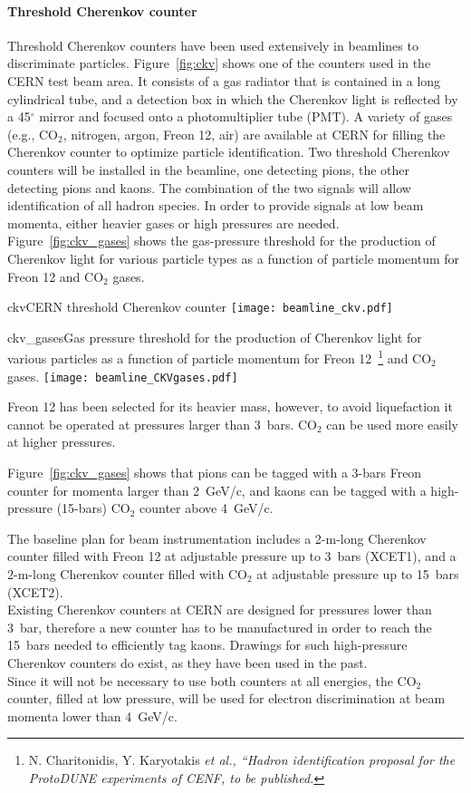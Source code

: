 \paragraph{Threshold Cherenkov counter}
Threshold Cherenkov counters have been used extensively in beamlines to discriminate particles. Figure~\ref{fig:ckv} shows one of the counters used in the CERN test beam area. It consists of a gas radiator that is contained in a long cylindrical tube, and a detection box in which the Cherenkov light is reflected by a 45$^\circ$ mirror and focused onto a photomultiplier tube (PMT). 
A variety of gases (e.g., CO$_2$, nitrogen, argon, Freon 12, air) are available at CERN for filling the Cherenkov counter to optimize particle identification. 
Two threshold Cherenkov counters will be installed in the beamline, one detecting pions, the other detecting pions 
and kaons. The combination of the two signals will allow identification of all hadron species. In order to provide signals at low beam momenta, either heavier gases or high pressures are needed.
Figure~\ref{fig:ckv_gases} shows the gas-pressure threshold 
for the production of Cherenkov light for various particle types as a function of particle momentum for Freon 12 and CO$_2$ gases.
\begin{cdrfigure}{ckv}{CERN threshold Cherenkov counter}
  \texttt{[image: beamline\_ckv.pdf]}
\end{cdrfigure}
\begin{cdrfigure}{ckv_gases}{Gas pressure threshold for the production of Cherenkov light for various particles as a function of particle momentum for Freon 12~\footnote{N. Charitonidis, Y. Karyotakis \it{et al.}, ``Hadron identification proposal for the ProtoDUNE experiments of CENF, to be published.} and CO$_2$ gases.}
  \texttt{[image: beamline\_CKVgases.pdf]}
\end{cdrfigure}
Freon 12 has been selected for its heavier mass, however,  to avoid liquefaction it cannot be operated at pressures larger than 3~bars.  CO$_2$ can be used more easily at higher pressures.  

 Figure~\ref{fig:ckv_gases} shows that pions can be tagged with a 3-bars Freon counter for momenta larger than 2~GeV/c, and kaons can be tagged with a high-pressure  (15-bars) CO$_2$  counter above 4~GeV/c.

The baseline plan for beam instrumentation includes a 2-m-long
Cherenkov  counter filled with Freon 12 at adjustable pressure up to
3~bars (XCET1), and a  2-m-long  
 Cherenkov  counter filled with CO$_2$ at adjustable pressure up to
 15~bars (XCET2).\\
Existing Cherenkov counters at CERN are designed for pressures lower than  3~bar, therefore a new counter has to be manufactured in order to reach the 15~bars needed to efficiently tag kaons. Drawings for such high-pressure Cherenkov counters do exist, as they have been %
used in the past. \\
%
Since it will not be necessary to use both counters at all energies, the CO$_2$
counter, filled at low pressure,  will be used for electron discrimination at beam momenta lower
than 4~GeV/c.  

